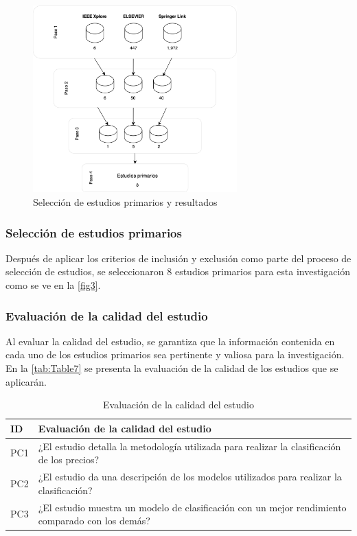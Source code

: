 \begin{figure}[h!]
	\centering
	\includegraphics[width=0.7\textwidth]{Chapter2/SelecEstudiPrim_3.png}
	\caption{Selección de estudios primarios y resultados}
	\label{fig3}
\end{figure}

\subsubsection{Selección de estudios primarios}
Después de aplicar los criterios de inclusión y exclusión como parte del proceso de selección de estudios, se seleccionaron 8 estudios primarios para esta investigación como se ve en la \autoref{fig3}.\\

\subsubsection{Evaluación de la calidad del estudio}
Al evaluar la calidad del estudio, se garantiza que la información contenida en cada uno de los estudios primarios sea pertinente y valiosa para la investigación. En la \autoref{tab:Table7} se presenta la evaluación de la calidad de los estudios que se aplicarán.

\begin{table}[H]
	\centering
	\begin{tabular}{ | m{2cm}| m{12cm} | }
		\hline
		\textbf{ID} & \textbf{Evaluación de la calidad del estudio}\\
		\hline
		PC1 & ¿El estudio detalla la metodología utilizada para realizar la clasificación de los precios?\\
		\hline
		PC2 & ¿El estudio da una descripción de los modelos utilizados para realizar la clasificación?\\
		\hline
		PC3 & ¿El estudio muestra un modelo de clasificación con un mejor rendimiento comparado con los demás?\\
		\hline
	\end{tabular}
	\caption{Evaluación de la calidad del estudio}
	\label{tab:Table7}
\end{table}

